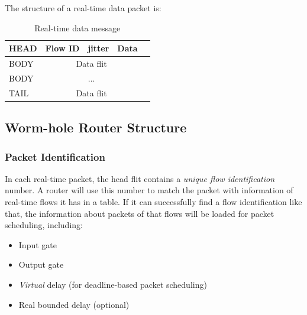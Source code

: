 \documentclass[conference, twocolumn]{IEEEtran}
\theoremstyle{definition}
\begin{document}
The structure of a real-time data packet is:

\begin{table}[htbp]
\begin{center}{
  \begin{tabular}{ | l | l | l | l | l |}
    \hline
	HEAD & Flow ID & jitter & Data \\ \hline 
	BODY & \multicolumn{3}{|c|}{Data flit} \\ \hline
	BODY &\multicolumn{3}{|c|}{...} \\ \hline
	TAIL & \multicolumn{3}{|c|}{Data flit} \\
    \hline
  \end{tabular}
}
\end{center}
\caption{Real-time data message}
\label{table:DataMsg}
\end{table}


% 

\subsection{Worm-hole Router Structure}
\subsubsection{Packet Identification}
In each real-time packet, the head flit contains a {\em unique flow
identification} number. A router will use this number to match the packet with
information of real-time flows it has in a table. If it can successfully find a
flow identification like that, the information about packets of that flows will
be loaded  for packet scheduling, including:
\begin{itemize}
  \item Input gate
  \item Output gate
  \item {\em Virtual} delay (for deadline-based packet scheduling)
  \item Real bounded delay (optional)
\end{itemize}
\end{document}
